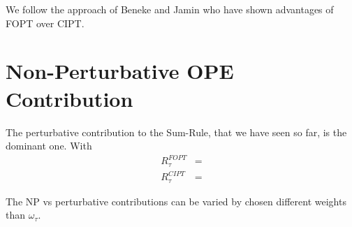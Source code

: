 \documentclass[../../index.tex]{subfiles}
\begin{document}
We follow the approach of Beneke and Jamin \cite{Benke2008} who have shown
advantages of FOPT over CIPT.


\section{Non-Perturbative OPE Contribution}
The perturbative contribution to the Sum-Rule, that we have seen so far, is the
dominant one. With
\begin{equation}
  \begin{split}
    R_\tau^{FOPT} &= \\ 
    R_\tau^{CIPT} &=  
  \end{split}
\end{equation}

The NP vs perturbative contributions can be varied by chosen different weights
than $\omega_\tau$.
\end{document}
